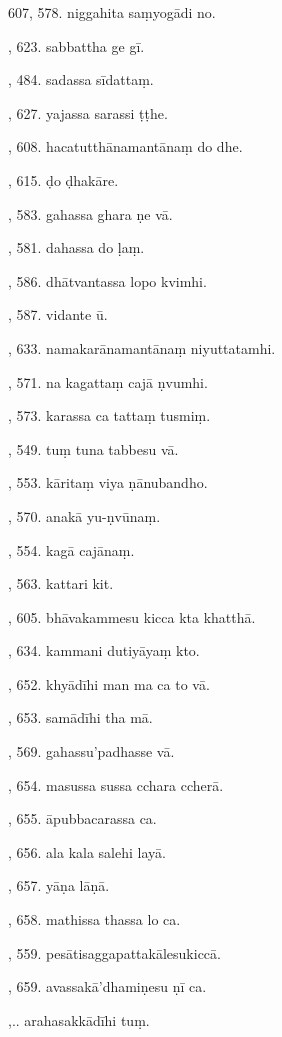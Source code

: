 607, 578. niggahita saṃyogādi no.\par {}, 623. sabbattha ge gī.\par {}, 484. sadassa sīdattaṃ.\par {}, 627. yajassa sarassi ṭṭhe.\par {}, 608. hacatutthānamantānaṃ do dhe.\par {}, 615. ḍo ḍhakāre.\par {}, 583. gahassa ghara ṇe vā.\par {}, 581. dahassa do ḷaṃ.\par {}, 586. dhātvantassa lopo kvimhi.\par {}, 587. vidante ū.\par {}, 633. namakarānamantānaṃ niyuttatamhi.\par {}, 571. na kagattaṃ cajā ṇvumhi.\par {}, 573. karassa ca tattaṃ tusmiṃ.\par {}, 549. tuṃ tuna tabbesu vā.\par {}, 553. kāritaṃ viya ṇānubandho.\par {}, 570. anakā yu-ṇvūnaṃ.\par {}, 554. kagā cajānaṃ.\par {}, 563. kattari kit.\par {}, 605. bhāvakammesu kicca kta khatthā.\par {}, 634. kammani dutiyāyaṃ kto.\par {}, 652. khyādīhi man ma ca to vā.\par {}, 653. samādīhi tha mā.\par {}, 569. gahassu’padhasse vā.\par {}, 654. masussa sussa cchara ccherā.\par {}, 655. āpubbacarassa ca.\par {}, 656. ala kala salehi layā.\par {}, 657. yāṇa lāṇā.\par {}, 658. mathissa thassa lo ca.\par {}, 559. pesātisaggapattakālesukiccā.\par {}, 659. avassakā’dhamiṇesu ṇī ca.\par {},.. arahasakkādīhi tuṃ.\par \noindent
